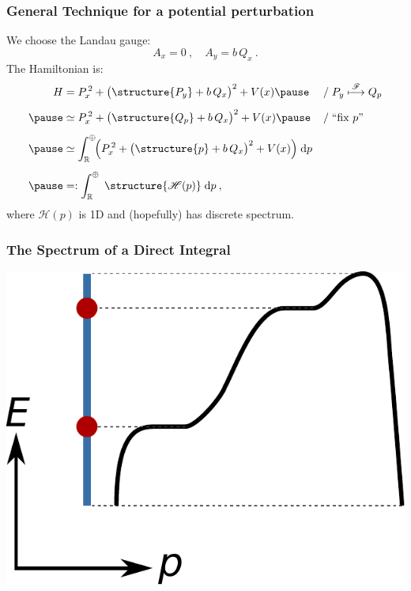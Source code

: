 \documentclass{beamer}
\renewcommand{\d}{\ensuremath{\mathrm d}}
\newcommand{\R}{\ensuremath{\mathbb R}}
\newcommand{\Hf}{\ensuremath{\mathscr H}}
\begin{document}
\begin{frame}
    \frametitle{General Technique \color{gray} for a potential perturbation}
    \pause
    We choose the Landau gauge:
    \begin{equation*}
        A_x = 0 \: , \quad
        A_y = b \, Q_x \: .
    \end{equation*}
    The Hamiltonian is:
    \begin{equation*}
    \begin{aligned}
        H &= P_x^{\,2} + \big( \structure{P_y} + b \, Q_x \big)^2 + V(x)
        \pause & & {/} \; P_y \overset{\mathscr F}{\longmapsto} Q_p
        \\[5pt] \pause
        &\simeq P_x^{\,2} + \big( \structure{Q_p} + b \, Q_x \big)^2 + V(x)
        \pause & & {/} \; \text{“fix } p \text{”}
        \\[5pt] \pause
        &\simeq \int^\oplus_\R \!\! \Big(
            P_x^{\,2} + \big( \structure{p} + b \, Q_x \big)^2 + V(x)
        \Big) \; \d p
        \\[5pt] \pause
        &=: \int^\oplus_\R \; \structure{\Hf(p)} \; \d p
        \: ,
    \end{aligned}
    \end{equation*}
    where $\Hf(p)$ is 1D and (hopefully) has discrete spectrum.
\end{frame}

\begin{frame}
    \frametitle{The Spectrum of a Direct Integral}
    \vspace{0.5cm}
    \centering
    \includegraphics[scale=0.8]{direct_integral_spectrum.pdf}
\end{frame}
\end{document}

